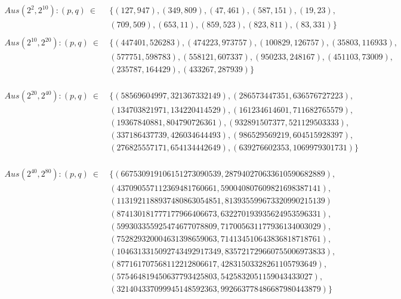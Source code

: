 \begin{refsegment}
\begin{equation*}
  \begin{split}
Aus (2^2, 2^{10}): (p,q)~\in~ & \{ (127,947),(349,809),(47,461),(587,151),(19,23),\\
                              & (709,509),(653,11),(859,523),(823,811),(83,331)\}\\
\\
Aus (2^{10}, 2^{20}): (p,q)~\in~
            & \{ (447401,526283),(474223,973757),(100829,126757),(35803,116933),\\
            &    (577751,598783),(558121,607337),(950233,248167),(451103,73009),\\
            &    (235787,164429),(433267,287939)\}\\
  \end{split}
\end{equation*}

\begin{equation*}
  \begin{split}
Aus (2^{20},2^{40}): (p,q)~\in~
            & \{ (58569604997,321367332149),(286573447351,636576727223),\\
            &    (134703821971,134220414529),(161234614601,711682765579),\\
            &    (19367840881, 804790726361),(932891507377,521129503333),\\
            &    (337186437739,426034644493),(986529569219,604515928397),\\
            &    (276825557171,654134442649),(639276602353,1069979301731) \}\\
  \end{split}
\end{equation*}

\begin{equation*}
  \begin{split}
Aus (2^{40}, 2^{80}): (p,q)~\in~
            & \{ (667530919106151273090539,287940270633610590682889),\\
            &    (437090557112369481760661,590040807609821698387141),\\
            &    (1131921188937480863054851,813935599673320990215139)\\
            &    (874130181777177966406673,632270193935624953596331),\\
            &    (599303355925474677078809,717005631177936134003029),\\
            &    (752829320004631398659063,714134510643836818718761),\\
            &    (1046313315092743492917349,835721729660755006973833),\\
            &    (877161707568112212806617,42831503328261105793649),\\
            &    (575464819450637793425803, 5425832051159043433027),\\
            &    (321404337099945148592363,992663778486687980443879) \}\\
  \end{split}
\end{equation*}


\end{refsegment}
